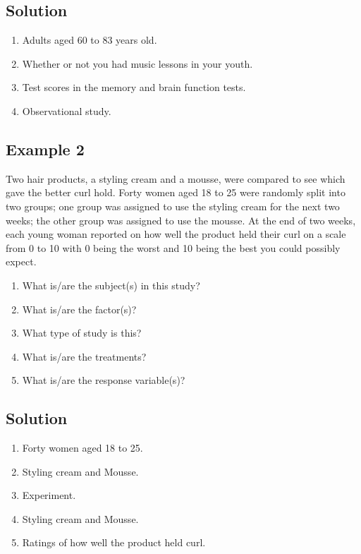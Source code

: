 \subsection*{Solution}

\begin{enumerate}
    \item Adults aged 60 to 83 years old.
    \item Whether or not you had music lessons in your youth.
    \item Test scores in the memory and brain function tests.
    \item Observational study.
\end{enumerate}


\subsection*{Example 2}

Two hair products, a styling cream and a mousse, were compared to see which gave the better curl hold. Forty women aged 18 to 25 were randomly split into two groups; one group was assigned to use the styling cream for the next two weeks; the other group was assigned to use the mousse. At the end of two weeks, each young woman reported on how well the product held their curl on a scale from 0 to 10 with 0 being the worst and 10 being the best you could possibly expect.

\begin{enumerate}
    \item What is/are the subject(s) in this study?
    \item What is/are the factor(s)?
    \item What type of study is this?
    \item What is/are the treatments?
    \item What is/are the response variable(s)?
\end{enumerate}

\subsection*{Solution}

\begin{enumerate}
    \item Forty women aged 18 to 25.
    \item Styling cream and Mousse.
    \item Experiment.
    \item Styling cream and Mousse.
    \item Ratings of how well the product held curl.
\end{enumerate}

